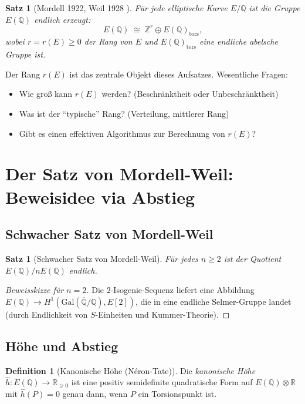 \documentclass[12pt,a4paper]{amsart}
\newtheorem{satz}[theorem]{Satz}
\theoremstyle{definition}
\newtheorem{definition_de}[theorem]{Definition}
\theoremstyle{remark}
\newcommand{\Z}{\mathbb{Z}}
\newcommand{\Q}{\mathbb{Q}}
\newcommand{\R}{\mathbb{R}}
\newcommand{\Gal}{\mathrm{Gal}}
\begin{document}
\begin{satz}[Mordell 1922, Weil 1928 \cite{Mordell1922,Weil1928}]
  Für jede elliptische Kurve $E/\Q$ ist die Gruppe $E(\Q)$ endlich erzeugt:
  \[
    E(\Q) \;\cong\; \Z^r \oplus E(\Q)_{\mathrm{tors}},
  \]
  wobei $r = r(E) \geq 0$ der \emph{Rang} von $E$ und $E(\Q)_{\mathrm{tors}}$ eine
  endliche abelsche Gruppe ist.
\end{satz}

Der Rang $r(E)$ ist das zentrale Objekt dieses Aufsatzes. Wesentliche Fragen:
\begin{itemize}
  \item Wie groß kann $r(E)$ werden? (Beschränktheit oder Unbeschränktheit)
  \item Was ist der ``typische'' Rang? (Verteilung, mittlerer Rang)
  \item Gibt es einen effektiven Algorithmus zur Berechnung von $r(E)$?
\end{itemize}

\section{Der Satz von Mordell-Weil: Beweisidee via Abstieg}\label{sec:mordell_weil}

\subsection{Schwacher Satz von Mordell-Weil}

\begin{satz}[Schwacher Satz von Mordell-Weil]
  Für jedes $n \geq 2$ ist der Quotient $E(\Q)/nE(\Q)$ endlich.
\end{satz}

\begin{proof}[Beweissk\glqq izze für $n=2$]
  Die $2$-Isogenie-Sequenz liefert eine Abbildung
  $E(\Q) \to H^1(\Gal(\overline{\Q}/\Q), E[2])$,
  die in eine endliche Selmer-Gruppe landet (durch Endlichkeit von $S$-Einheiten und
  Kummer-Theorie).
\end{proof}

\subsection{Höhe und Abstieg}

\begin{definition_de}[Kanonische Höhe (Néron-Tate)]
  Die \emph{kanonische Höhe} $\hat{h}\colon E(\Q) \to \R_{\geq 0}$ ist eine positiv
  semidefinite quadratische Form auf $E(\Q) \otimes \R$ mit $\hat{h}(P) = 0$ genau dann,
  wenn $P$ ein Torsionspunkt ist.
\end{definition_de}
\end{document}
